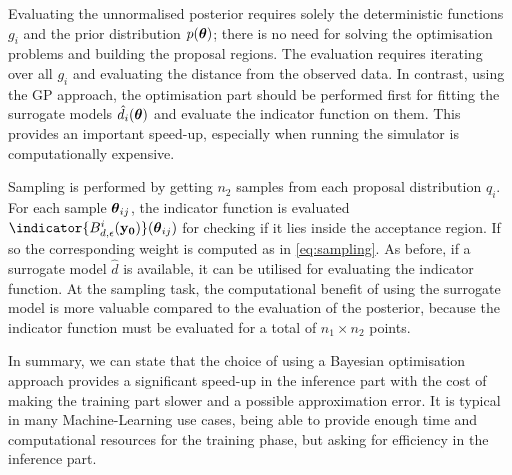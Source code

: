 \noindent
Evaluating the unnormalised posterior requires solely the
deterministic functions $g_i$ and the prior distribution $p(\boldsymbol{\theta})$;
there is no need for solving the optimisation problems and building
the proposal regions. The evaluation requires iterating over all $g_i$
and evaluating the distance from the observed data. In contrast, using
the GP approach, the optimisation part should be performed first for
fitting the surrogate models $\hat{d}_i(\boldsymbol{\theta})$ and evaluate the
indicator function on them. This provides an important speed-up,
especially when running the simulator is computationally
expensive. %

\noindent
Sampling is performed by getting $n_2$ samples from each proposal
distribution $q_i$. For each sample $\boldsymbol{\theta}_{ij}$, the indicator
function is evaluated $\indicator{\regioni(\data)}(\thetab_{ij})$ for
checking if it lies inside the acceptance region. If so the
corresponding weight is computed as in \eqref{eq:sampling}. As before,
if a surrogate model $\hat{d}$ is available, it can be utilised for
evaluating the indicator function. At the sampling task, the
computational benefit of using the surrogate model is more valuable
compared to the evaluation of the posterior, because the indicator
function must be evaluated for a total of $n_1 \times n_2$ points.

\noindent
In summary, we can state that the choice of using a Bayesian
optimisation approach provides a significant speed-up in the inference
part with the cost of making the training part slower and a possible
approximation error. It is typical in many Machine-Learning use cases,
being able to provide enough time and computational resources for the
training phase, but asking for efficiency in the inference
part.

